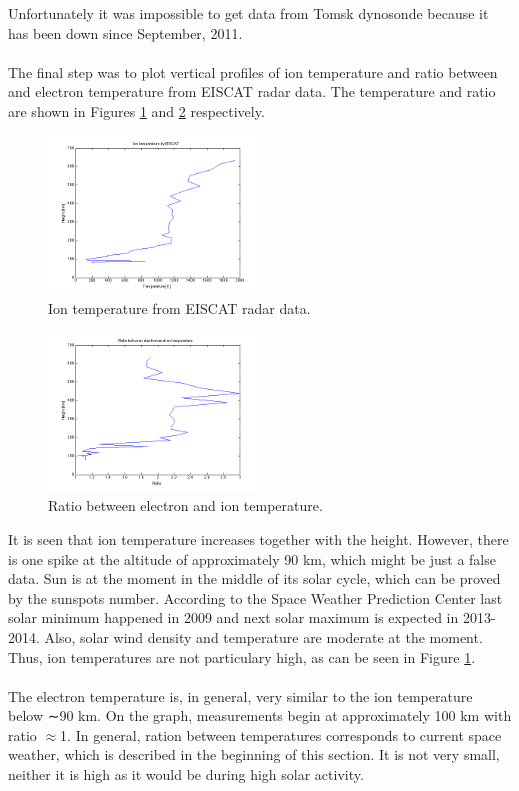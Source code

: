 \documentclass{article}
\begin{document}
Unfortunately it was impossible to get data from Tomsk dynosonde because it has been down since September, 2011.\\
\\
The final step was to plot vertical profiles of ion temperature and ratio between and electron temperature from EISCAT radar data. The temperature and ratio are shown in Figures \ref{fig:ion_t} and \ref{fig:ratio} respectively.
\begin{figure}[h!tb]
	\centering
	\includegraphics[width=0.5\textwidth]{Figures/ion_t.png}
	\caption{Ion temperature from EISCAT radar data.}
	\label{fig:ion_t}
\end{figure}
\begin{figure}[h!tb]
	\centering
	\includegraphics[width=0.5\textwidth]{Figures/ratio.png}
	\caption{Ratio between electron and ion temperature.}
	\label{fig:ratio}
\end{figure}

It is seen that ion temperature increases together with the height. However, there is one spike at the altitude of approximately 90 km, which might be just a false data. Sun is at the moment in the middle of its solar cycle, which can be proved by the sunspots number. According to the Space Weather Prediction Center last solar minimum happened in 2009 and next solar maximum is expected in 2013-2014. Also, solar wind density and temperature are moderate at the moment. Thus, ion temperatures are not particulary high, as can be seen in Figure \ref{fig:ion_t}.\\
\\
The electron temperature is, in general, very similar to the ion temperature below ∼90 km. \cite{Kohnlein:1985mei} On the graph, measurements begin at approximately 100 km with ratio $\approx$1. In general, ration between temperatures corresponds to current space weather, which is described in the beginning of this section. It is not very small, neither it is high as it would be during high solar activity.
\end{document}
